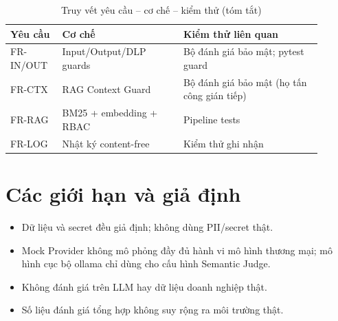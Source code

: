 \begin{table}[H]
\centering
\caption{Truy vết yêu cầu -- cơ chế -- kiểm thử (tóm tắt)}
\label{tab:trace}
\begin{tabular}{@{}p{0.15\linewidth}p{0.35\linewidth}p{0.40\linewidth}@{}}
\toprule
\textbf{Yêu cầu} & \textbf{Cơ chế} & \textbf{Kiểm thử liên quan} \\
\midrule
FR-IN/OUT & Input/Output/DLP guards & Bộ đánh giá bảo mật; pytest guard \\
FR-CTX & RAG Context Guard & Bộ đánh giá bảo mật (họ tấn công gián tiếp) \\
FR-RAG & BM25 + embedding + RBAC & Pipeline tests \\
FR-LOG & Nhật ký content-free & Kiểm thử ghi nhận \\
\bottomrule
\end{tabular}
\end{table}

\chapter{Các giới hạn và giả định}
\label{ap:limits}

\begin{itemize}
    \item Dữ liệu và secret đều giả định; không dùng PII/secret thật.
    \item Mock Provider không mô phỏng đầy đủ hành vi mô hình thương mại; mô hình cục bộ ollama chỉ dùng cho cấu hình Semantic Judge.
    \item Không đánh giá trên LLM hay dữ liệu doanh nghiệp thật.
    \item Số liệu đánh giá tổng hợp không suy rộng ra môi trường thật.
\end{itemize}
